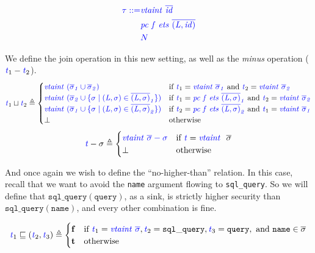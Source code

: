 \documentclass{llncs}
\begin{document}
\[\color{blue}
\begin{aligned}
  \tau ::= & \mathit{\color{blue} vtaint ~ \overline{id}} \\
  & \mathit{\color{blue} pc ~ f ~ ets ~ \overline{(L,id)}} \\
  & {\color{blue} N} \\
\end{aligned}\]

We define the join operation in this new setting, as well as the {\em minus} operation (\(\mathit{\color{blue} t}_1 - \mathit{\color{blue} t}_2\)).
%
\[\mathit{\color{blue} t}_1 \sqcup \mathit{\color{blue} t}_2 \triangleq
\begin{cases}
  \mathit{\color{blue} vtaint ~ (\overline{\sigma}_1 \cup \overline{\sigma}_2)} &
  \textnormal{if } \mathit{\color{blue} t}_1 = \mathit{\color{blue} vtaint ~ \overline{\sigma}_1} \textnormal{ and }
  \mathit{\color{blue} t}_2 = \mathit{\color{blue} vtaint ~ \overline{\sigma}_2}\\
  \mathit{\color{blue} vtaint ~ (\overline{\sigma}_2 \cup \{\sigma \mid (L,\sigma) \in \overline{(L,\sigma)}_1\})} &
  \textnormal{if } \mathit{\color{blue} t}_1 = \mathit{\color{blue} pc ~ f ~ ets ~ \overline{(L,\sigma)}_1} \textnormal{ and }
  \mathit{\color{blue} t}_2 = \mathit{\color{blue} vtaint ~ \overline{\sigma}_2}\\
  \mathit{\color{blue} vtaint ~ (\overline{\sigma}_1 \cup \{\sigma \mid (L,\sigma) \in \overline{(L,\sigma)}_2\})} &
  \textnormal{if } \mathit{\color{blue} t}_2 = \mathit{\color{blue} pc ~ f ~ ets ~ \overline{(L,\sigma)}_2} \textnormal{ and }
  \mathit{\color{blue} t}_1 = \mathit{\color{blue} vtaint ~ \overline{\sigma}_1}\\
  \bot & \textnormal{otherwise} \\
\end{cases}\]
%
\[\mathit{\color{blue} t} - \sigma \triangleq
\begin{cases}
  \mathit{\color{blue} vtaint ~ \overline{\sigma} - \sigma} &
  \textnormal{if } \mathit{\color{blue} t} = \mathit{\color{blue} vtaint ~ ~} \overline{\sigma} \\
  \bot & \textnormal{otherwise} \\
\end{cases}\]

And once again we wish to define the ``no-higher-than'' relation. In this case,
recall that we want to avoid the {\tt name} argument flowing to {\tt sql\_query}.
So we will define that \(\mathtt{sql\_query(query)}\), as a sink, is strictly
higher security than \(\mathtt{sql\_query(name)}\), and every other combination is fine.

\[\mathit{\color{blue} t}_1 \sqsubseteq (\mathit{\color{blue} t}_2,\mathit{\color{blue} t}_3) \triangleq
\begin{cases}
  \mathbf{f} & \textnormal{if } \mathit{\color{blue} t}_1 = \mathit{\color{blue} vtaint ~ \overline{\sigma}},
  \mathit{\color{blue} t}_2 = \mathtt{sql\_query}, \mathit{\color{blue} t}_3 = \mathtt{query}, \textnormal{ and }
  \mathtt{name} \in \overline{\sigma} \\
  \mathbf{t} & \textnormal{otherwise} \\
\end{cases}\]
\end{document}
